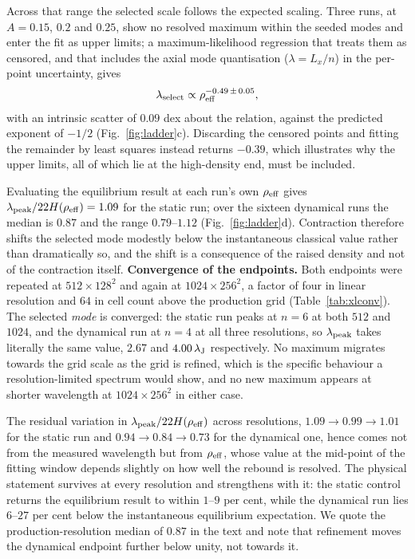 \documentclass[usenatbib,twoside,twocolumn]{mnras}
\begin{document}
Across that range the selected scale follows the expected scaling. Three runs, at $A=0.15$, $0.2$ and $0.25$, show no resolved maximum within the seeded modes and enter the fit as upper limits; a maximum-likelihood regression that treats them as censored, and that includes the axial mode quantisation ($\lambda=L_x/n$) in the per-point uncertainty, gives
\begin{equation}
\lambda_{\rm select}\propto\rho_{\rm eff}^{-0.49\,\pm\,0.05},
\label{eq:ladderfit}
\end{equation}
with an intrinsic scatter of $0.09$ dex about the relation, against the predicted exponent of $-1/2$ (Fig.~\ref{fig:ladder}c). Discarding the censored points and fitting the remainder by least squares instead returns $-0.39$, which illustrates why the upper limits, all of which lie at the high-density end, must be included.

Evaluating the equilibrium result at each run's own $\rho_{\rm eff}$ gives $\lambda_{\rm peak}/22H(\rho_{\rm eff})=1.09$ for the static run; over the sixteen dynamical runs the median is $0.87$ and the range $0.79$--$1.12$ (Fig.~\ref{fig:ladder}d). Contraction therefore shifts the selected mode modestly below the instantaneous classical value rather than dramatically so, and the shift is a consequence of the raised density  and not of the contraction itself. \smallskip\noindent\textbf{Convergence of the endpoints.} Both endpoints were repeated at $512\times128^2$ and again at $1024\times256^2$, a factor of four in linear resolution and $64$ in cell count above the production grid (Table~\ref{tab:xlconv}). The selected \emph{mode} is converged: the static run peaks at $n=6$ at both $512$ and $1024$, and the dynamical run at $n=4$ at all three resolutions, so $\lambda_{\rm peak}$ takes literally the same value, $2.67$ and $4.00\,\lambda_{\rm J}$ respectively. No maximum migrates towards the grid scale as the grid is refined, which is the specific behaviour a resolution-limited spectrum would show, and no new maximum appears at shorter wavelength at $1024\times256^2$ in either case.

The residual variation in $\lambda_{\rm peak}/22H(\rho_{\rm eff})$ across resolutions, $1.09\to0.99\to1.01$ for the static run and $0.94\to0.84\to0.73$ for the dynamical one, hence comes not from the measured wavelength but from $\rho_{\rm eff}$, whose value at the mid-point of the fitting window depends slightly on how well the rebound is resolved. The physical statement survives at every resolution and strengthens with it: the static control returns the equilibrium result to within $1$--$9$ per cent, while the dynamical run lies $6$--$27$ per cent below the instantaneous equilibrium expectation. We quote the production-resolution median of $0.87$ in the text and note that refinement moves the dynamical endpoint further below unity, not towards it.
\end{document}

